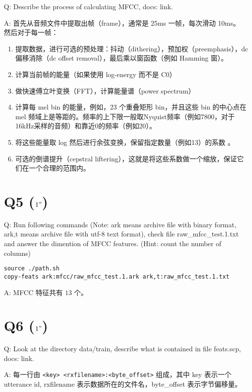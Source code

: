 \documentclass[degree=project,degree-type=project,cjk-font=noto]{thuthesis}
\begin{document}
Q: Describe the process of calculating MFCC, docs: link.

A: 首先从音频文件中提取出帧（frame），通常是 25ms 一帧，每次滑动 10ms。
然后对于每一帧：

\begin{enumerate}
  \item 提取数据，进行可选的预处理：抖动（dithering），预加权（preemphasis），dc 偏移消除（dc offset removal），最后乘以窗函数（例如 Hamming 窗）。
  \item 计算当前帧的能量（如果使用 log-energy 而不是 C0）
  \item 做快速傅立叶变换（FFT），计算能量谱（power spectrum）
  \item 计算每 mel bin 的能量，例如，23 个重叠矩形 bin，并且这些 bin 的中心点在 mel 频域上是等距的。频率的上下限一般取Nyquist频率（例如7800，对于16kHz采样的音频）和靠近0的频率（例如20）。
  \item 将这些能量取 log 然后进行余弦变换，保留指定数量（例如13）的系数 。
  \item 可选的倒谱提升（cepstral liftering），这就是将这些系数做一个缩放，保证它们在一个合理的范围内。
\end{enumerate}

\section{Q5 ($1"$)}

Q: Run following commands (Note: ark means archive file with binary format, ark,t means archive file with utf-8 text format), check file raw\_mfcc\_test.1.txt and answer the dimention of MFCC features. (Hint: count the number of columns)
  \begin{verbatim}
source ./path.sh
copy-feats ark:mfcc/raw_mfcc_test.1.ark ark,t:raw_mfcc_test.1.txt
  \end{verbatim}

A: MFCC 特征共有 $13$ 个。

\section{Q6 ($1"$)}

Q: Look at the directory data/train, describe what is contained in file feats.scp, docs: link.

A: 每一行由 \texttt{<key> <rxfilename>:<byte\_offset>} 组成，其中 key 表示一个 utterance id, rxfilename 表示数据所在的文件名，byte\_offset 表示字节偏移量。
\end{document}
